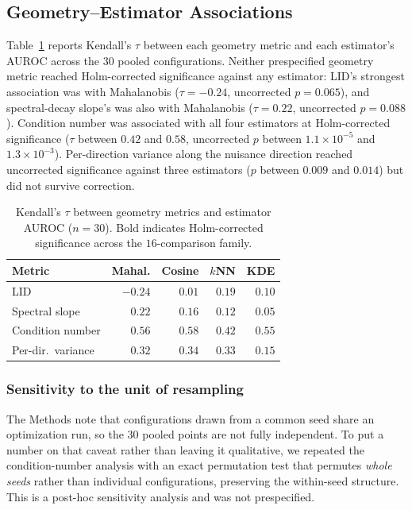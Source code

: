 \subsection{Geometry--Estimator Associations}

Table~\ref{tab:c2} reports Kendall's $\tau$ between each geometry metric and
each estimator's AUROC across the $30$ pooled configurations. Neither
prespecified geometry metric reached Holm-corrected significance against any
estimator: LID's strongest association was with Mahalanobis
($\tau = -0.24$, uncorrected $p = 0.065$), and spectral-decay slope's was
also with Mahalanobis ($\tau = 0.22$, uncorrected $p = 0.088$). Condition
number was associated with all four estimators at Holm-corrected significance
($\tau$ between $0.42$ and $0.58$, uncorrected $p$ between
$1.1\times10^{-5}$ and $1.3\times10^{-3}$). Per-direction variance along the
nuisance direction reached uncorrected significance against three estimators
($p$ between $0.009$ and $0.014$) but did not survive correction.

\begin{table}[!t]
\caption{Kendall's $\tau$ between geometry metrics and estimator AUROC
($n=30$). Bold indicates Holm-corrected significance across the
$16$-comparison family.}
\label{tab:c2}
\centering
\begin{tabular}{lrrrr}
\toprule
Metric & Mahal. & Cosine & $k$NN & KDE \\
\midrule
LID                & $-0.24$ & $0.01$ & $0.19$ & $0.10$ \\
Spectral slope     & $0.22$  & $0.16$ & $0.12$ & $0.05$ \\
Condition number   & $\mathbf{0.56}$ & $\mathbf{0.58}$ & $\mathbf{0.42}$ & $\mathbf{0.55}$ \\
Per-dir.\ variance & $0.32$  & $0.34$ & $0.33$ & $0.15$ \\
\bottomrule
\end{tabular}
\end{table}

\subsubsection*{Sensitivity to the unit of resampling}

The Methods note that configurations drawn from a common seed share an
optimization run, so the $30$ pooled points are not fully independent. To put a
number on that caveat rather than leaving it qualitative, we repeated the
condition-number analysis with an exact permutation test that permutes
\emph{whole seeds} rather than individual configurations, preserving the
within-seed structure. This is a post-hoc sensitivity analysis and was not
prespecified.

